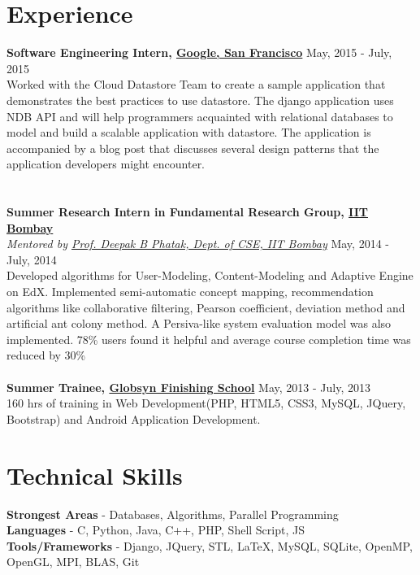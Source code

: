 \documentclass[margin, centered]{res}
\begin{document}
\begin{resume}
\section{Experience}
\textbf{Software Engineering Intern, \href{http://www.google.com}{Google, San Francisco}} \hfill May, 2015 - July, 2015\\
Worked with the Cloud Datastore Team to create a sample application that demonstrates the best practices to use datastore. The django application uses NDB API and will help programmers acquainted with relational databases to model and build a scalable application with datastore. The application is accompanied by a blog post that discusses several design patterns that the application developers might encounter. \\
\\
\\
\textbf{Summer Research Intern in Fundamental Research Group, \href{http://www.cse.iitb.ac.in/}{IIT Bombay}} \\
\emph{Mentored by \href{http://en.wikipedia.org/wiki/Deepak_B._Phatak}{Prof. Deepak B Phatak, Dept. of CSE, IIT Bombay}} \hfill May, 2014 - July, 2014 \\
Developed algorithms for User-Modeling, Content-Modeling and Adaptive Engine on EdX. Implemented semi-automatic concept mapping, recommendation algorithms like collaborative filtering, Pearson coefficient, deviation method and artificial ant colony method. A Persiva-like system evaluation model was also implemented. 78\% users found it helpful and average course completion time was reduced by 30\%\\
\\
\textbf{Summer Trainee, \href{http://www.globsynskills.com/gfs/}{Globsyn Finishing School}} \hfill May, 2013 - July, 2013 \\
160 hrs of training in Web Development(PHP, HTML5, CSS3, MySQL, JQuery, Bootstrap) and Android Application Development.

\section{Technical \hspace{2mm} Skills}
\textbf{Strongest Areas} - Databases, Algorithms, Parallel Programming \\
\textbf{Languages} - C, Python, Java, C++, PHP, Shell Script, JS\\
\textbf{Tools/Frameworks} - Django, JQuery, STL, \LaTeX, MySQL, SQLite, OpenMP, OpenGL, MPI, BLAS, Git


\end{resume}
\end{document}
